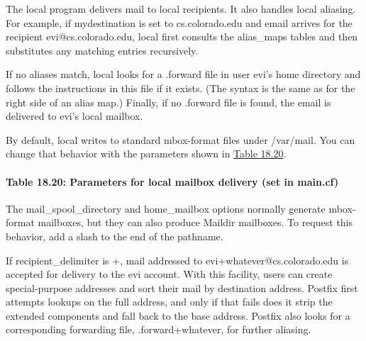 The
\protect\hypertarget{part0026_split_061.htmlux5cux23_idIndexMarker2716}{}{}{local}
program delivers mail to local recipients. It also handles local
aliasing. For example, if {mydestination }is set to cs.colorado.edu and
email arrives for the recipient evi@cs.colorado.edu, {local} first
consults the {alias\_maps} tables and then substitutes any matching
entries recursively.

If no aliases match, {local} looks for a
\protect\hypertarget{part0026_split_061.htmlux5cux23_idIndexMarker2717}{}{}{.forward}
file in user evi's home directory and follows the instructions in this
file if it exists. (The syntax is the same as for the right side of an
alias map.) Finally, if no {.forward} file is found, the email is
delivered to evi's local mailbox.

By default, {local} writes to standard {mbox}-format files under
{/var/mail}. You can change that behavior with the parameters shown in
\protect\hyperlink{part0026_split_061.htmlux5cux23_idTextAnchor1181}{Table
18.20}.

\paragraph[{Table 18.20: }Parameters for local mailbox delivery (set in
{main.cf})]{\texorpdfstring{{Table 18.20:
}\protect\hypertarget{part0026_split_061.htmlux5cux23_idTextAnchor1181}{}{}\protect\hypertarget{part0026_split_061.htmlux5cux23_idTextAnchor1182}{}{}Parameters
for local mailbox delivery (set in
{main.cf}){\protect\hypertarget{part0026_split_061.htmlux5cux23_idIndexMarker2718}{}{}\protect\hypertarget{part0026_split_061.htmlux5cux23_idIndexMarker2719}{}{}\protect\hypertarget{part0026_split_061.htmlux5cux23_idIndexMarker2720}{}{}\protect\hypertarget{part0026_split_061.htmlux5cux23_idIndexMarker2721}{}{}\protect\hypertarget{part0026_split_061.htmlux5cux23_idIndexMarker2722}{}{}}}{Table 18.20: Parameters for local mailbox delivery (set in main.cf)}}


The {mail\_spool\_directory} and {home\_mailbox} options normally
generate {mbox}-format mailboxes, but they can also produce {Maildir}
mailboxes. To request this behavior, add a slash to the end of the
pathname.

If {recipient\_delimiter} is {+}, mail addressed to
evi+{whatever}@cs.colorado.edu is accepted for delivery to the evi
account. With this facility, users can create special-purpose addresses
and sort their mail by destination address. Postfix first attempts
lookups on the full address, and only if that fails does it strip the
extended components and fall back to the base address. Postfix also
looks for a corresponding forwarding file, {.forward+}{whatever}, for
further aliasing.

